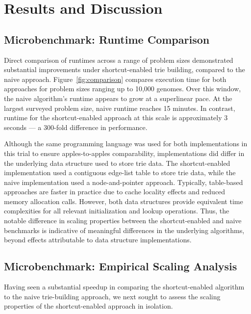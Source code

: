 \section{Results and Discussion} \label{sec:results}

\subsection{Microbenchmark: Runtime Comparison}

Direct comparison of runtimes across a range of problem sizes demonstrated substantial improvements under shortcut-enabled trie building, compared to the naive approach.
Figure~\ref{fig:comparison} compares execution time for both approaches for problem sizes ranging up to 10,000 genomes.
Over this window, the naive algorithm's runtime appears to grow at a superlinear pace.
At the largest surveyed problem size, naive runtime reaches 15 minutes.
In contrast, runtime for the shortcut-enabled approach at this scale is approximately 3 seconds --- a 300-fold difference in performance.



Although the same programming language was used for both implementations in this trial to ensure apples-to-apples comparability, implementations did differ in the underlying data structure used to store trie data.
The shortcut-enabled implementation used a contiguous edge-list table to store trie data, while the naive implementation used a node-and-pointer approach.
Typically, table-based approaches are faster in practice due to cache locality effects and reduced memory allocation calls.
However, both data structures provide equivalent time complexities for all relevant initialization and lookup operations.
Thus, the notable difference in scaling properties between the shortcut-enabled and naive benchmarks is indicative of meaningful differences in the underlying algorithms, beyond effects attributable to data structure implementations.

\subsection{Microbenchmark: Empirical Scaling Analysis}



Having seen a substantial speedup in comparing the shortcut-enabled algorithm to the naive trie-building approach, we next sought to assess the scaling properties of the shortcut-enabled approach in isolation.

